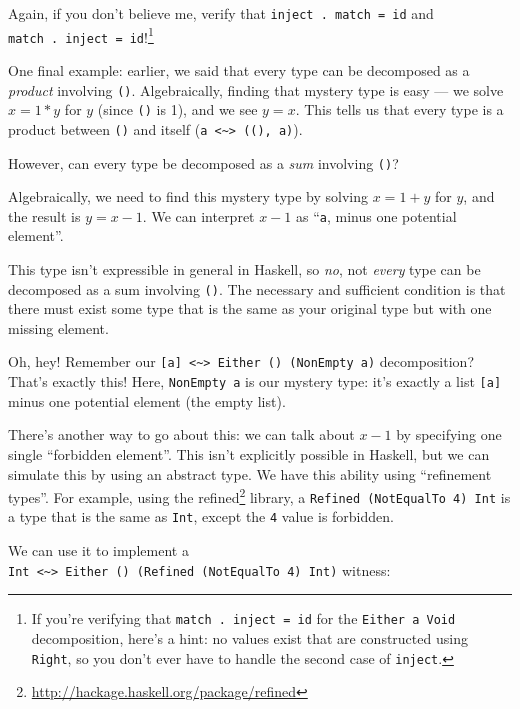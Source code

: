 \documentclass[]{article}
\renewcommand{\href}[2]{#2\footnote{\url{#1}}}
\begin{document}
Again, if you don't believe me, verify that \texttt{inject\ .\ match\ =\ id} and
\texttt{match\ .\ inject\ =\ id}!\footnote{If you're verifying that
  \texttt{match\ .\ inject\ =\ id} for the \texttt{Either\ a\ Void}
  decomposition, here's a hint: no values exist that are constructed using
  \texttt{Right}, so you don't ever have to handle the second case of
  \texttt{inject}.}

One final example: earlier, we said that every type can be decomposed as a
\emph{product} involving \texttt{()}. Algebraically, finding that mystery type
is easy --- we solve \(x = 1 * y\) for \(y\) (since \texttt{()} is 1), and we
see \(y = x\). This tells us that every type is a product between \texttt{()}
and itself (\texttt{a\ \textless{}\textasciitilde{}\textgreater{}\ ((),\ a)}).

However, can every type be decomposed as a \emph{sum} involving \texttt{()}?

Algebraically, we need to find this mystery type by solving \(x = 1 + y\) for
\(y\), and the result is \(y = x - 1\). We can interpret \(x - 1\) as
``\texttt{a}, minus one potential element''.

This type isn't expressible in general in Haskell, so \emph{no}, not
\emph{every} type can be decomposed as a sum involving \texttt{()}. The
necessary and sufficient condition is that there must exist some type that is
the same as your original type but with one missing element.

Oh, hey! Remember our
\texttt{{[}a{]}\ \textless{}\textasciitilde{}\textgreater{}\ Either\ ()\ (NonEmpty\ a)}
decomposition? That's exactly this! Here, \texttt{NonEmpty\ a} is our mystery
type: it's exactly a list \texttt{{[}a{]}} minus one potential element (the
empty list).

There's another way to go about this: we can talk about \(x - 1\) by specifying
one single ``forbidden element''. This isn't explicitly possible in Haskell, but
we can simulate this by using an abstract type. We have this ability using
``refinement types''. For example, using the
\href{http://hackage.haskell.org/package/refined}{refined} library, a
\texttt{Refined\ (NotEqualTo\ 4)\ Int} is a type that is the same as
\texttt{Int}, except the \texttt{4} value is forbidden.

We can use it to implement a
\texttt{Int\ \textless{}\textasciitilde{}\textgreater{}\ Either\ ()\ (Refined\ (NotEqualTo\ 4)\ Int)}
witness:
\end{document}
